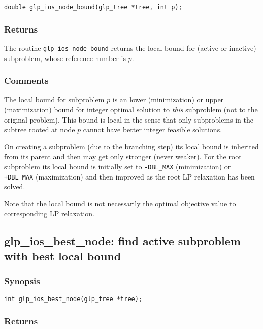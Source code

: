 \begin{verbatim}
double glp_ios_node_bound(glp_tree *tree, int p);
\end{verbatim}

\subsubsection*{Returns}

The routine \verb|glp_ios_node_bound| returns the local bound for
(active or inactive) subproblem, whose reference number is $p$.

\subsubsection*{Comments}

The local bound for subproblem $p$ is an lower (minimization) or upper
(maximization) bound for integer optimal solution to {\it this}
subproblem (not to the original problem). This bound is local in the
sense that only subproblems in the subtree rooted at node $p$ cannot
have better integer feasible solutions.

On creating a subproblem (due to the branching step) its local bound is
inherited from its parent and then may get only stronger (never weaker).
For the root subproblem its local bound is initially set to
\verb|-DBL_MAX| (minimization) or \verb|+DBL_MAX| (maximization) and
then improved as the root LP relaxation has been solved.

Note that the local bound is not necessarily the optimal objective value
to corresponding LP relaxation.

\subsection{glp\_ios\_best\_node: find active subproblem with best local
bound}

\subsubsection*{Synopsis}

\begin{verbatim}
int glp_ios_best_node(glp_tree *tree);
\end{verbatim}

\subsubsection*{Returns}

